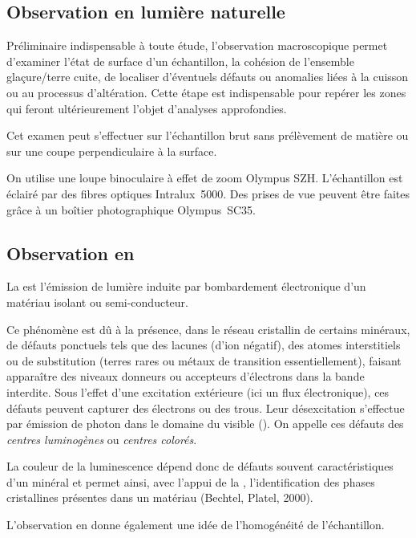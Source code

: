\subsection{Observation en lumière naturelle}
Préliminaire indispensable à toute étude, l'observation macroscopique 
permet d'examiner l'état de surface d'un échantillon, la cohésion de 
l'ensemble glaçure/terre cuite, de localiser d'éventuels défauts ou 
anomalies liées à la cuisson ou au processus d'altération. Cette étape 
est indispensable pour repérer les zones qui feront ultérieurement 
l'objet d'analyses approfondies.

Cet examen peut s'effectuer sur l'échantillon brut sans prélèvement 
de matière ou sur une coupe perpendiculaire à la surface.

On utilise une loupe binoculaire à effet de zoom Olympus SZH. 
L'échantillon est éclairé par des fibres optiques Intralux~5000. 
Des prises de vue peuvent être faites grâce à un boîtier 
photographique Olympus~SC35.

\subsection{Observation en \CL}
La \CL est l'émission de lumière induite par bombardement électronique 
d'un matériau isolant ou semi-conducteur.

Ce phénomène est dû à la présence, dans le réseau cristallin de 
certains minéraux, de défauts ponctuels tels que des lacunes (d'ion 
négatif), des atomes interstitiels ou de substitution (terres rares 
ou métaux de transition essentiellement), faisant apparaître des 
niveaux donneurs ou accepteurs d'électrons dans la bande interdite. 
Sous l'effet d'une excitation extérieure (ici un flux électronique), 
ces défauts peuvent capturer des électrons ou des trous. Leur 
désexcitation s'effectue par émission de photon dans le domaine 
du visible (). On appelle ces défauts des 
\emph{centres luminogènes} ou \emph{centres colorés}.

La couleur de la luminescence dépend donc de défauts souvent 
caractéristiques d'un minéral et permet ainsi, avec l'appui de 
la \DX, l'identification des phases cristallines présentes dans 
un matériau (Bechtel, Platel, 2000).

L'observation en \CL donne également une idée de l'homogénéité de 
l'échantillon.

